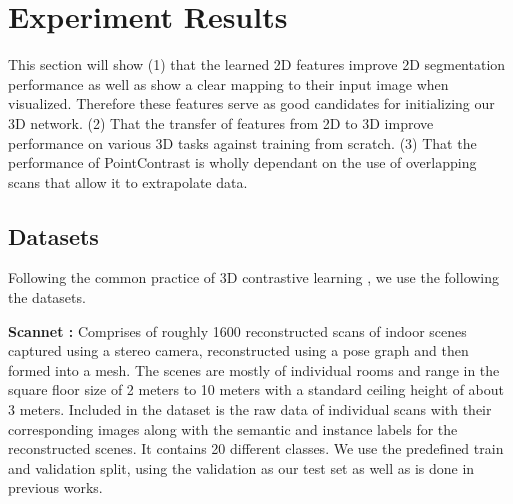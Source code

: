 \documentclass[10pt,twocolumn,letterpaper]{article}
\begin{document}
\begin{table}[t!]
    \centering
    \caption{Object Detection using VoteNet  (mAP)}
    \label{table:scannetObjectDetection}
\end{table}

\section{Experiment Results}
\label{sec:results}

This section will show (1) that the learned 2D features improve 2D segmentation performance as well as show a clear mapping to their input image when visualized. Therefore these features serve as good candidates for initializing our 3D network. (2) That the transfer of features from 2D to 3D improve performance on various 3D tasks against training from scratch. (3) That the performance of PointContrast is wholly dependant on the use of overlapping scans that allow it to extrapolate data.

\subsection{Datasets}
\label{sec:results:datasets}

Following the common practice of 3D contrastive learning \cite{xie2020pointcontrast,hou2021Exploring, zhang2021Self, jiang2021Guided}, we use the following the datasets.

\textbf{Scannet \cite{Dai2017ScanNet}:} Comprises of roughly 1600 reconstructed scans of indoor scenes captured using a stereo camera, reconstructed using a pose graph and then formed into a mesh. The scenes are mostly of individual rooms and range in the square floor size of 2 meters to 10 meters with a standard ceiling height of about 3 meters. Included in the dataset is the raw data of individual scans with their corresponding images along with the semantic and instance labels for the reconstructed scenes. It contains 20 different classes. We use the predefined train and validation split, using the validation as our test set as well as is done in previous works.
\end{document}
